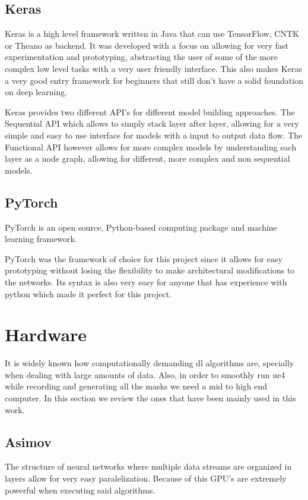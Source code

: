 \subsection{Keras}
Keras is a high level framework written in Java that can use TensorFlow, CNTK or Theano as backend. It was developed with a focus on allowing for very fast experimentation and prototyping, abstracting the user of some of the more complex low level tasks with a very user friendly interface. This also makes Keras a very good entry framework for beginners that still don't have a solid foundation on deep learning.

Keras provides two different API's for different model building approaches. The Sequential API which allows to simply stack layer after layer, allowing for a very simple and easy to use interface for models with a input to output data flow. The Functional API however allows for more complex models by understanding each layer as a node graph, allowing for different, more complex and non sequential models.
 
\subsection{PyTorch}
PyTorch is an open source, Python-based computing package and machine learning framework.

PyTorch was the framework of choice for this project since it allows for easy prototyping without losing the flexibility to make architectural modifications to the networks. Its syntax is also very easy for anyone that has experience with python which made it perfect for this project.

\section{Hardware}
It is widely known how computationally demanding \gls{dl} algorithms are, specially when dealing with large amounts of data. Also, in order to smoothly run \gls{ue4} while recording and generating all the masks we need a mid to high end computer. In this section we review the ones that have been mainly used in this work.

\subsection{Asimov}

The structure of neural networks where multiple data streams are organized in layers allow for very easy paralelization. Because of this GPU's are extremely powerful when executing said algorithms.

